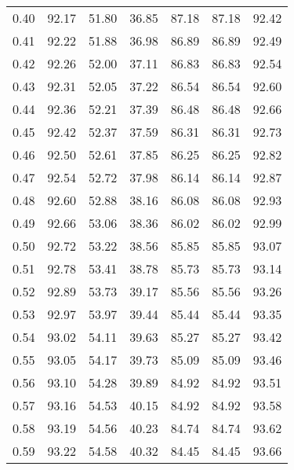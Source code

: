 \begin{tabular}{|c|c|c|c|c|c|c|}
      0.40 &     92.17 &     51.80 &      36.85 &   87.18 &      87.18 &         92.42 \\
      0.41 &     92.22 &     51.88 &      36.98 &   86.89 &      86.89 &         92.49 \\
      0.42 &     92.26 &     52.00 &      37.11 &   86.83 &      86.83 &         92.54 \\
      0.43 &     92.31 &     52.05 &      37.22 &   86.54 &      86.54 &         92.60 \\
      0.44 &     92.36 &     52.21 &      37.39 &   86.48 &      86.48 &         92.66 \\
      0.45 &     92.42 &     52.37 &      37.59 &   86.31 &      86.31 &         92.73 \\
      0.46 &     92.50 &     52.61 &      37.85 &   86.25 &      86.25 &         92.82 \\
      0.47 &     92.54 &     52.72 &      37.98 &   86.14 &      86.14 &         92.87 \\
      0.48 &     92.60 &     52.88 &      38.16 &   86.08 &      86.08 &         92.93 \\
      0.49 &     92.66 &     53.06 &      38.36 &   86.02 &      86.02 &         92.99 \\
      0.50 &     92.72 &     53.22 &      38.56 &   85.85 &      85.85 &         93.07 \\
      0.51 &     92.78 &     53.41 &      38.78 &   85.73 &      85.73 &         93.14 \\
      0.52 &     92.89 &     53.73 &      39.17 &   85.56 &      85.56 &         93.26 \\
      0.53 &     92.97 &     53.97 &      39.44 &   85.44 &      85.44 &         93.35 \\
      0.54 &     93.02 &     54.11 &      39.63 &   85.27 &      85.27 &         93.42 \\
      0.55 &     93.05 &     54.17 &      39.73 &   85.09 &      85.09 &         93.46 \\
      0.56 &     93.10 &     54.28 &      39.89 &   84.92 &      84.92 &         93.51 \\
      0.57 &     93.16 &     54.53 &      40.15 &   84.92 &      84.92 &         93.58 \\
      0.58 &     93.19 &     54.56 &      40.23 &   84.74 &      84.74 &         93.62 \\
      0.59 &     93.22 &     54.58 &      40.32 &   84.45 &      84.45 &         93.66 \\

\end{tabular}
